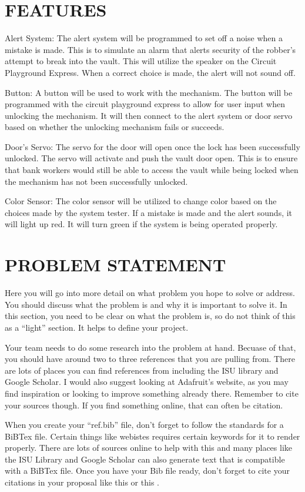 \documentclass[12pt]{article}
\begin{document}
\section{FEATURES}

Alert System:
The alert system will be programmed to set off a noise when a mistake is made. This is to simulate an alarm that alerts security of the robber's attempt to break into the vault. This will utilize the speaker on the Circuit Playground Express. When a correct choice is made, the alert will not sound off. 

Button:
A button will be used to work with the mechanism. The button will be programmed with the circuit playground express to allow for user input when unlocking the mechanism. It will then connect to the alert system or door servo based on whether the unlocking mechanism fails or succeeds.

Door's Servo:
The servo for the door will open once the lock has been successfully unlocked. The servo will activate and push the vault door open. This is to ensure that bank workers would still be able to access the vault while being locked when the mechanism has not been successfully unlocked.

Color Sensor:
The color sensor will be utilized to change color based on the choices made by the system tester. If a mistake is made and the alert sounds, it will light up red. It will turn green if the system is being operated properly.

\section{PROBLEM STATEMENT}
Here you will go into more detail on what problem you hope to solve or address.  You should discuss what the problem is and why it is important to solve it. In this section, you need to be clear on what the problem is, so do not think of this as a ``light'' section. It helps to define your project.

Your team needs to do some research into the problem at hand. Becuase of that, you should have around two to three references that you are pulling from. There are lots of places you can find references from including the ISU library and Google Scholar. I would also suggest looking at Adafruit's website, as you may find inspiration or looking to improve something already there. Remember to cite your sources though. If you find something online, that can often be citation.

When you create your ``ref.bib'' file, don't forget to follow the standards for a BiBTex file. Certain things like webistes requires certain keywords for it to render properly. There are lots of sources online to help with this and many places like the ISU Library and Google Scholar can also generate text that is compatible with a BiBTex file. Once you have your Bib file ready, don't forget to cite your citations in your proposal like this \cite{einstein} or this \cite{dirac}.
\end{document}
